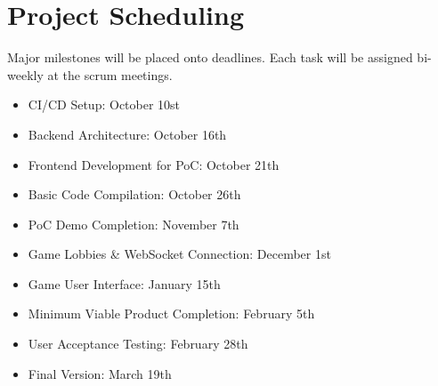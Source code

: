 \documentclass{article}
\begin{document}
\section{Project Scheduling}

Major milestones will be placed onto deadlines. Each task will be assigned bi-weekly at the scrum meetings.

\begin{itemize} 
    \item CI/CD Setup: October 10st
    \item Backend Architecture: October 16th
    \item Frontend Development for PoC: October 21th
    \item Basic Code Compilation: October 26th
    \item PoC Demo Completion: November 7th
    \item Game Lobbies \& WebSocket Connection: December 1st
    \item Game User Interface: January 15th
    \item Minimum Viable Product Completion: February 5th
    \item User Acceptance Testing: February 28th
    \item Final Version: March 19th
\end{itemize}
\end{document}
